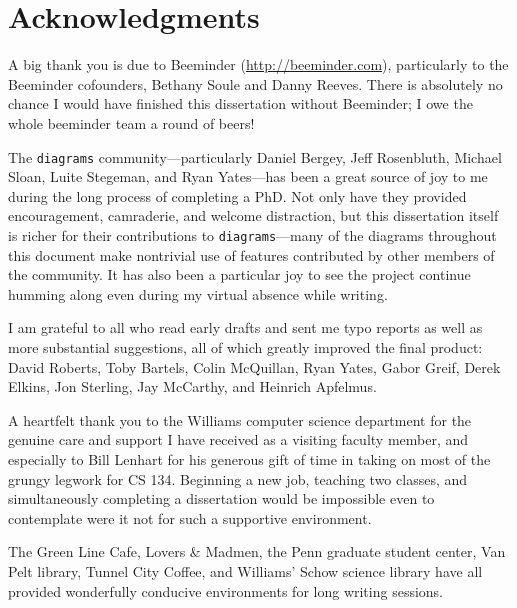 
\newpage
\chapter*{Acknowledgments}

A big thank you is due to Beeminder (\url{http://beeminder.com}),
particularly to the Beeminder cofounders, Bethany Soule and Danny
Reeves.  There is absolutely no chance I would have finished this
dissertation without Beeminder; I owe the whole beeminder team a round
of beers!

The \texttt{diagrams} community---particularly Daniel Bergey, Jeff
Rosenbluth, Michael Sloan, Luite Stegeman, and Ryan Yates---has been a
great source of joy to me during the long process of completing a PhD.
Not only have they provided encouragement, camraderie, and welcome
distraction, but this dissertation itself is richer for their
contributions to \texttt{diagrams}---many of the diagrams throughout
this document make nontrivial use of features contributed by other
members of the community.  It has also been a particular joy to see
the project continue humming along even during my virtual absence
while writing.

I am grateful to all who read early drafts and sent me typo reports as
well as more substantial suggestions, all of which greatly improved
the final product: David Roberts, Toby Bartels, Colin McQuillan, Ryan
Yates, Gabor Greif, Derek Elkins, Jon Sterling, Jay McCarthy, and
Heinrich Apfelmus.

A heartfelt thank you to the Williams computer science department for
the genuine care and support I have received as a visiting faculty
member, and especially to Bill Lenhart for his generous gift of time
in taking on most of the grungy legwork for CS 134.  Beginning a new
job, teaching two classes, and simultaneously completing a
dissertation would be impossible even to contemplate were it not for
such a supportive environment.

The Green Line Cafe, Lovers \& Madmen, the Penn graduate student
center, Van Pelt library, Tunnel City Coffee, and Williams' Schow
science library have all provided wonderfully conducive environments
for long writing sessions.

